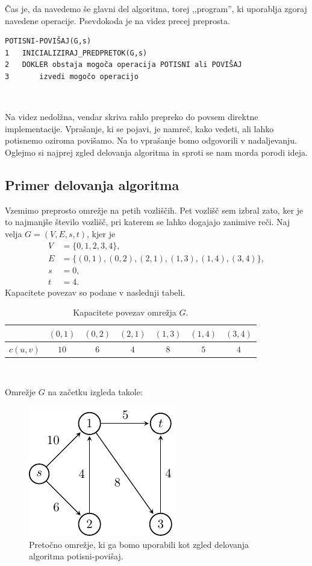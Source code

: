 \documentclass[mat1]{fmfdelo}
\begin{document}
Čas je, da navedemo še glavni del algoritma, torej ,,program'', ki uporablja zgoraj navedene operacije. Psevdokoda je na videz precej preprosta.\\

\begin{verbatim}
POTISNI-POVIŠAJ(G,s)
1   INICIALIZIRAJ_PREDPRETOK(G,s)
2   DOKLER obstaja mogoča operacija POTISNI ali POVIŠAJ
3       izvedi mogočo operacijo
\end{verbatim}~

Na videz nedolžna, vendar skriva rahlo prepreko do povsem direktne implementacije. Vprašanje, ki se pojavi, je namreč, kako vedeti, ali lahko potisnemo oziroma povišamo. Na to vprašanje bomo odgovorili v nadaljevanju. Oglejmo si najprej zgled delovanja algoritma in sproti se nam morda porodi ideja.\\

\subsection{Primer delovanja algoritma}

Vzemimo preprosto omrežje na petih vozliščih. Pet vozlišč sem izbral zato, ker je to najmanjše število vozlišč, pri katerem se lahko dogajajo zanimive reči. Naj velja $G = (V, E, s, t)$, kjer je
\begin{align*}
	V &= \{0,1,2,3,4\},\\
	E &= \{(0,1), (0,2), (2,1), (1,3), (1,4), (3,4)\},\\
	s &= 0,\\
	t &= 4.
\end{align*}
Kapacitete povezav so podane v naslednji tabeli.

\begin{table}[h!]
\centering
\caption{Kapacitete povezav omrežja $G$.}
\begin{tabular}{|l|c|c|c|c|c|c|}
\hline
         & $(0,1)$ & $(0,2)$ & $(2,1)$ & $(1,3)$ & $(1,4)$ & $(3,4)$\\ \hline
$c(u,v)$ &   $10$  &   $6$   &   $4$   &   $8$   &   $5$   &   $4$  \\ \hline
\end{tabular}
\end{table}~

Omrežje $G$ na začetku izgleda takole:

\begin{figure}[H]
  \centering
  \includegraphics{images/graf2-1.pdf}
  \caption{Pretočno omrežje, ki ga bomo uporabili kot zgled delovanja algoritma potisni-povišaj.}
\end{figure}
\end{document}
